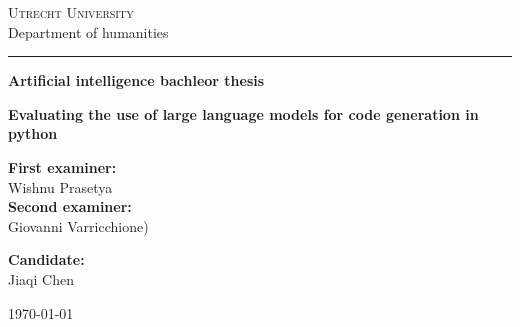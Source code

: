 
\begin{titlepage}

\begin{center}
{\scshape \Large
Utrecht University\\
}
\vspace{4mm}
{\Large
Department of humanities
}
\vspace{8mm}
\hrule
\vspace{4mm}
\begin{spacing}{1.8}
{\large\textbf{
Artificial intelligence bachleor thesis
}}
\end{spacing}
\vspace{42mm}

\begin{spacing}{2.0}
{\Large \bf Evaluating the use of large language models for code generation in python}\\
\end{spacing}
\end{center}

\vfill
\noindent
\begin{minipage}[t]{0.5\textwidth}
\large
\textbf{First examiner:
}\\
Wishnu Prasetya\\
 \vspace{5mm}
\textbf{Second examiner:}\\
Giovanni Varricchione)\\
\end{minipage}
\hfill
\begin{minipage}[t]{0.5\textwidth}\raggedleft
\large
\textbf{Candidate:}\\
Jiaqi Chen\\
 \vspace{5mm}
\end{minipage}

\vspace{24mm}

\begin{center}
\large \today
\end{center}

\end{titlepage}
\restoregeometry